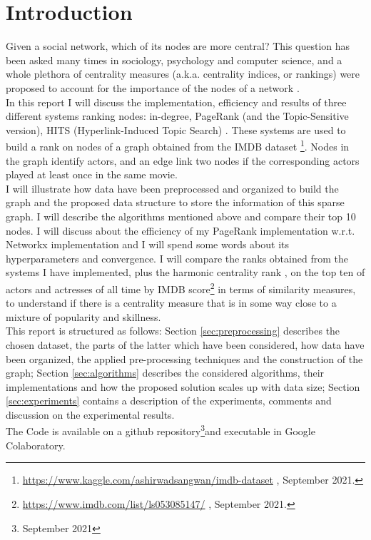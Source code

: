 \documentclass{article}
\begin{document}
\section*{Introduction}
Given a social network, which of its nodes are more central? This question has been asked many times in sociology, psychology and computer science, and a whole plethora of centrality measures (a.k.a. centrality indices, or rankings) were proposed to account for the importance of the nodes of a network \cite{Boldi2013}. \\In this report I will discuss the implementation, efficiency and results of three different systems ranking nodes: in-degree, PageRank \cite{Page1999ThePC} (and the Topic-Sensitive \cite{Tsrank2003} version), HITS (Hyperlink-Induced Topic Search) \cite{Hits1999}. These systems are used to build a rank on nodes of a graph obtained from the IMDB dataset \footnote{\url{https://www.kaggle.com/ashirwadsangwan/imdb-dataset} , September 2021.\label{foo:imdb-dataset}}. Nodes in the graph identify actors, and an edge link two nodes if the corresponding actors played at least once in the same movie.\\ I will illustrate how data have been preprocessed and organized to build the graph and the proposed data structure to store the information of this sparse graph. I will describe the algorithms mentioned above and compare their top 10 nodes. I will discuss about the efficiency of my PageRank implementation w.r.t. Networkx \cite{Networkx2008} implementation and I will spend some words about its hyperparameters and convergence. I will compare the ranks obtained from the systems I have implemented, plus the harmonic centrality rank \cite{Boldi2013}, on the top ten of actors and actresses of all time by IMDB score\footnote{\url{https://www.imdb.com/list/ls053085147/} , September 2021.\label{foo:imdb-top}} in terms of similarity measures, to understand if there is a centrality measure that is in some way close to a mixture of popularity and skillness. \\
This report is structured as follows: Section \ref{sec:preprocessing} describes the chosen dataset, the parts of the latter which have been considered, how data have been organized, the applied pre-processing techniques and the construction of the graph; Section \ref{sec:algorithms} describes the considered algorithms, their implementations and how the proposed solution scales up with data size; Section \ref{sec:experiments} contains a description of the experiments, comments and discussion on the experimental results.\\
The Code is available on a github repository\footnote{\url{} September 2021}and executable in Google Colaboratory.
\end{document}
